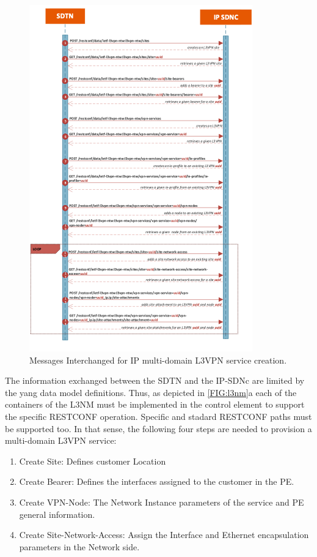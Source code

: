 \documentclass[a4paper,fleqn]{cas-dc}
\begin{document}
\begin{figure}
	\centering
		\includegraphics[width=\linewidth]{figs/l3vpn_workflow.png}
	\caption{Messages Interchanged for IP multi-domain L3VPN service creation.}
	\label{FIG:l3vpn_workflow}
\end{figure}

The information exchanged between the SDTN and the IP-SDNc are limited by the yang data model definitions. Thus, as depicted in \cref{FIG:l3nm}a each of the containers of the L3NM must be implemented in the control element to support the specific RESTCONF operation. Specific and stadard RESTCONF paths must be supported too. In that sense, the following four steps are needed to provision a multi-domain L3VPN service:
\begin{enumerate}
    \item Create Site: Defines customer Location
    \item Create Bearer: Defines the interfaces assigned to the customer in the PE.
    \item Create VPN-Node: The Network Instance parameters of the service and PE general information.  
    \item Create Site-Network-Access: Assign the Interface and Ethernet encapsulation parameters in the Network side. 
\end{enumerate}
\end{document}
